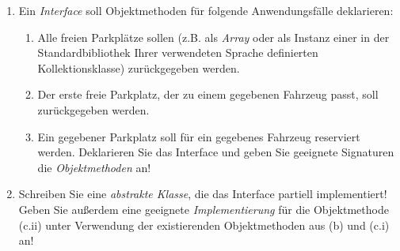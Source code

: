 \documentclass{lehramt-informatik-aufgabe}
\begin{document}
\begin{enumerate}
\begin{antwort}
\end{antwort}


\item Ein \emph{Interface}  soll Objektmethoden für
folgende Anwendungsfälle deklarieren:

\begin{enumerate}


\item Alle freien Parkplätze sollen (z.B. als \emph{Array} oder als
Instanz einer in der Standardbibliothek Ihrer verwendeten Sprache
definierten Kollektionsklasse) zurückgegeben werden.


\item Der erste freie Parkplatz, der zu einem gegebenen Fahrzeug passt,
soll zurückgegeben werden.


\item Ein gegebener Parkplatz soll für ein gegebenes Fahrzeug reserviert
werden. Deklarieren Sie das Interface und geben Sie geeignete Signaturen
die \emph{Objektmethoden} an!
\end{enumerate}

\begin{antwort}
\end{antwort}

\item Schreiben Sie eine \emph{abstrakte Klasse}, die das Interface
 partiell implementiert! Geben Sie außerdem eine
geeignete \emph{Implementierung} für die Objektmethode (c.ii) unter
Verwendung der existierenden Objektmethoden aus (b) und (c.i) an!

\begin{antwort}
\end{antwort}

\end{enumerate}
\end{document}
